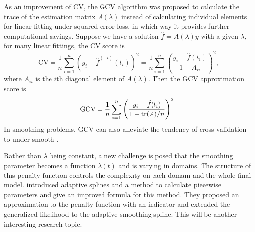 As an improvement of CV, the GCV algorithm was proposed to calculate the trace of the estimation matrix $A(\lambda)$ instead of calculating individual elements for linear fitting under squared error loss, in which way it provides further computational savings. Suppose we have a solution $\hat{f}=A(\lambda)y$ with a given $\lambda$, for many linear fittings, the CV score is 
\begin{equation*}
\mbox{CV} = \frac{1}{n}\sum_{i=1}^{n} \left( y_i - \hat{f}^{(-i)}(t_i)\right)^2 = \frac{1}{n} \sum_{i=1}^{n}\left( \frac{y_i-\hat{f}(t_i)}{1-A_{ii}}  \right)^2, 
\end{equation*}
where $A_{ii}$ is the $i$th diagonal element of $A(\lambda)$. Then the GCV approximation score is 
\begin{equation*}
\mbox{GCV} =\frac{1}{n} \sum_{i=1}^{n}\left( \frac{y_i-\hat{f}(t_i)}{1-\mathrm{tr}(A)/n}  \right)^2.
\end{equation*}
In smoothing problems, GCV can also alleviate the tendency of cross-validation to under-smooth \cite{esl2009}. 


%


Rather than $\lambda$ being constant, a new challenge is posed that the smoothing parameter becomes a function $\lambda(t)$ and is varying in domains. The structure of this penalty function controls the complexity on each domain and the whole final model.  \cite{donoho1995wavelet} introduced adaptive splines and a method to calculate piecewise parameters and \cite{liu2010data} give an improved formula for this method. They  proposed an approximation to the penalty function with an indicator and extended the generalized likelihood to the adaptive smoothing spline. This will be another interesting research topic. 


